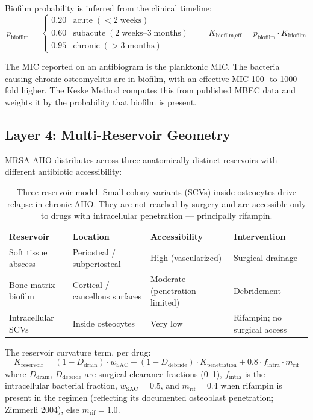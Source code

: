 \documentclass[11pt]{article}
\begin{document}
Biofilm probability is inferred from the clinical timeline:
\[
  p_{\text{biofilm}} =
  \begin{cases}
    0.20 & \text{acute} \;(<\!2\;\text{weeks}) \\
    0.60 & \text{subacute} \;(2\;\text{weeks–}3\;\text{months}) \\
    0.95 & \text{chronic} \;(>\!3\;\text{months})
  \end{cases}
  \qquad
  K_{\text{biofilm,eff}} = p_{\text{biofilm}} \cdot K_{\text{biofilm}}
\]

The MIC reported on an antibiogram is the planktonic MIC. The bacteria causing
chronic osteomyelitis are in biofilm, with an effective MIC 100- to 1000-fold
higher. The Keske Method computes this from published MBEC data and weights it
by the probability that biofilm is present.

\subsection{Layer 4: Multi-Reservoir Geometry}

MRSA-AHO distributes across three anatomically distinct reservoirs with
different antibiotic accessibility:

\begin{table}[h!]
\centering
\small
\begin{tabular}{p{3.2cm} p{2.8cm} p{2.8cm} p{3.5cm}}
\toprule
\textbf{Reservoir} & \textbf{Location} & \textbf{Accessibility} & \textbf{Intervention} \\
\midrule
Soft tissue abscess & Periosteal / subperiosteal & High (vascularized) & Surgical drainage \\
Bone matrix biofilm & Cortical / cancellous surfaces & Moderate (penetration-limited) & Debridement \\
Intracellular SCVs & Inside osteocytes & Very low & Rifampin; no surgical access \\
\bottomrule
\end{tabular}
\caption{Three-reservoir model. Small colony variants (SCVs) inside osteocytes
drive relapse in chronic AHO. They are not reached by surgery and are accessible
only to drugs with intracellular penetration — principally rifampin.}
\end{table}

The reservoir curvature term, per drug:
\[
  K_{\text{reservoir}} = (1 - D_{\text{drain}}) \cdot w_{\text{SAC}}
    + (1 - D_{\text{debride}}) \cdot K_{\text{penetration}}
    + 0.8 \cdot f_{\text{intra}} \cdot m_{\text{rif}}
\]
where $D_{\text{drain}}$, $D_{\text{debride}}$ are surgical clearance fractions
(0–1), $f_{\text{intra}}$ is the intracellular bacterial fraction,
$w_{\text{SAC}} = 0.5$, and $m_{\text{rif}} = 0.4$ when rifampin is present in
the regimen (reflecting its documented osteoblast penetration; Zimmerli 2004),
else $m_{\text{rif}} = 1.0$.
\end{document}
